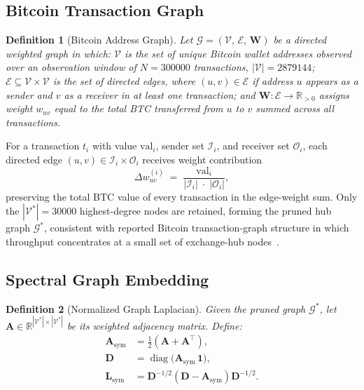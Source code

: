 \documentclass[journal]{IEEEtran}
\newtheorem{definition}{Definition}
\begin{document}
\subsection{Bitcoin Transaction Graph}
\label{subsec:graph_def}

\begin{definition}[Bitcoin Address Graph]
\label{def:graph}
Let $\mathcal{G} = (\mathcal{V},\,\mathcal{E},\,\mathbf{W})$ be a
\emph{directed weighted graph} in which:
$\mathcal{V}$ is the set of unique Bitcoin wallet addresses observed
over an observation window of $N = \num{300000}$ transactions,
$|\mathcal{V}| = \num{2879144}$;
$\mathcal{E} \subseteq \mathcal{V}\times\mathcal{V}$ is the set of directed
edges, where $(u,v)\in\mathcal{E}$ if address $u$ appears as a sender and $v$
as a receiver in at least one transaction; and
$\mathbf{W}:\mathcal{E}\to\mathbb{R}_{>0}$ assigns weight $w_{uv}$ equal to the
total BTC transferred from $u$ to $v$ summed across all transactions.
\end{definition}

For a transaction $t_i$ with value $\mathrm{val}_i$, sender set
$\mathcal{I}_i$, and receiver set $\mathcal{O}_i$, each directed edge
$(u,v)\in\mathcal{I}_i\times\mathcal{O}_i$ receives weight contribution
\begin{equation}
  \Delta w_{uv}^{(i)}
    \;=\;
    \frac{\mathrm{val}_i}{|\mathcal{I}_i|\;\cdot\;|\mathcal{O}_i|},
  \label{eq:edge_weight}
\end{equation}
preserving the total BTC value of every transaction in the edge-weight sum.
Only the $|\mathcal{V}^{*}| = \num{30000}$ highest-degree nodes are retained,
forming the pruned hub graph $\mathcal{G}^{*}$, consistent with reported
Bitcoin transaction-graph structure in which throughput concentrates at a
small set of exchange-hub nodes~\cite{Li2023}.

\subsection{Spectral Graph Embedding}
\label{subsec:spectral_def}

\begin{definition}[Normalized Graph Laplacian]
Given the pruned graph $\mathcal{G}^{*}$, let
$\mathbf{A}\in\mathbb{R}^{|\mathcal{V}^{*}|\times|\mathcal{V}^{*}|}$ be its
weighted adjacency matrix. Define:
\begin{align}
  \mathbf{A}_{\mathrm{sym}} &= \tfrac{1}{2}(\mathbf{A} + \mathbf{A}^{\!\top}),
  \label{eq:Asym} \\
  \mathbf{D} &= \operatorname{diag}\!\bigl(\mathbf{A}_{\mathrm{sym}}\,\mathbf{1}\bigr),
  \label{eq:degree} \\
  \mathbf{L}_{\mathrm{sym}} &= \mathbf{D}^{-1/2}(\mathbf{D}-\mathbf{A}_{\mathrm{sym}})\mathbf{D}^{-1/2}.
  \label{eq:Lsym}
\end{align}
\end{definition}
\end{document}
